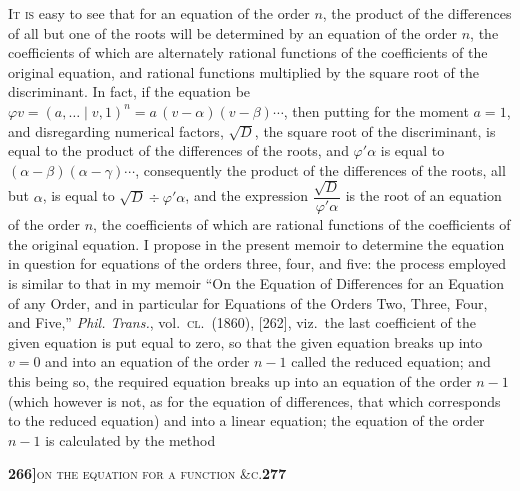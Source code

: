 \documentclass[11pt]{article}
\newcommand{\Cdel}{\mid}
\begin{document}
\noindent\textsc{It is} easy to see that for an equation of the order $n$, the product of the differences of all but one of the roots will be determined by an equation of the order $n$, the coefficients of which are alternately rational functions of the coefficients of the original equation, and rational functions multiplied by the square root of the discriminant. In fact, if the equation be $\varphi v = (a, \ldots \Cdel v, 1)^n = a\,(v - \alpha)(v - \beta)\cdots$, then putting for the moment $a = 1$, and disregarding numerical factors, $\sqrt{D}$, the square root of the discriminant, is equal to the product of the differences of the roots, and $\varphi'\alpha$ is equal to $(\alpha - \beta)(\alpha - \gamma)\cdots$, consequently the product of the differences of the roots, all but $\alpha$, is equal to $\sqrt{D} \div \varphi'\alpha$, and the expression $\dfrac{\sqrt{D}}{\varphi'\alpha}$ is the root of an equation of the order $n$, the coefficients of which are rational functions of the coefficients of the original equation. I propose in the present memoir to determine the equation in question for equations of the orders three, four, and five: the process employed is similar to that in my memoir ``On the Equation of Differences for an Equation of any Order, and in particular for Equations of the Orders Two, Three, Four, and Five,'' \textit{Phil. Trans.}, vol.~\textsc{cl.}\ (1860), [262], viz.\ the last coefficient of the given equation is put equal to zero, so that the given equation breaks up into $v = 0$ and into an equation of the order $n - 1$ called the reduced equation; and this being so, the required equation breaks up into an equation of the order $n - 1$ (which however is not, as for the equation of differences, that which corresponds to the reduced equation) and into a linear equation; the equation of the order $n - 1$ is calculated by the method

\newpage
\setcounter{page}{277}

\noindent\textbf{266]}\hfill\textsc{on the equation for a function \&c.}\hfill\textbf{277}

\medskip
\end{document}
